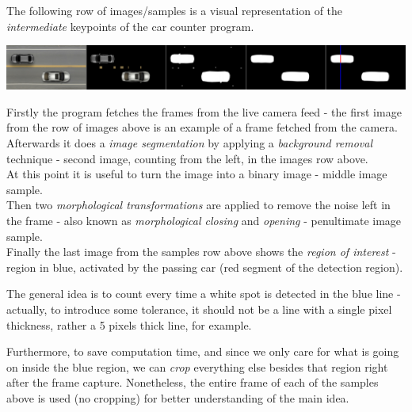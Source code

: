 The following row of images/samples is a visual representation of the \textit{intermediate} keypoints of the car counter program.

\begin{center}
    \includegraphics[width=\textwidth]{res/32.png}
\end{center}

Firstly the program fetches the frames from the live camera feed - the first image from the row of images above is an example of a frame fetched from the camera.\\
Afterwards it does a \textit{image segmentation} by applying a \textit{background removal} technique - second image, counting from the left, in the images row above.\\
At this point it is useful to turn the image into a binary image - middle image sample.\\
Then two \textit{morphological transformations} are applied to remove the noise left in the frame - also known as \textit{morphological closing} and \textit{opening} - penultimate image sample.\\
Finally the last image from the samples row above shows the \textit{region of interest} - region in blue, activated by the passing car (red segment of the detection region).

The general idea is to count every time a white spot is detected in the blue line - actually, to introduce some tolerance, it should not be a line with a single pixel thickness, rather a 5 pixels thick line, for example.

Furthermore, to save computation time, and since we only care for what is going on inside the blue region, we can \textit{crop} everything else besides that region right after the frame capture. Nonetheless, the entire frame of each of the samples above is used (no cropping) for better understanding of the main idea.

